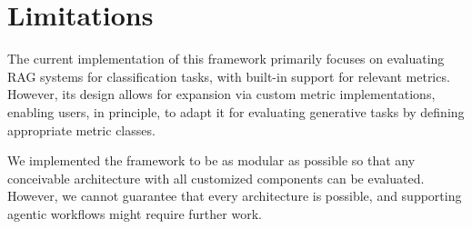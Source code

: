 \section{Limitations}

The current implementation of this framework primarily focuses on evaluating RAG systems for classification tasks, with built-in support for relevant metrics. However, its design allows for expansion via custom metric implementations, enabling users, in principle, to adapt it for evaluating generative tasks by defining appropriate metric classes.

We implemented the framework to be as modular as possible so that any conceivable architecture with all customized components can be evaluated. However, we cannot guarantee that every architecture is possible, and supporting agentic workflows might require further work.


